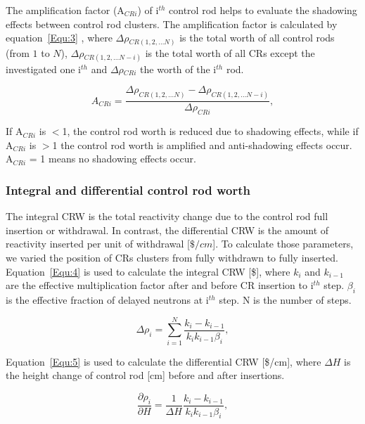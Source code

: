 The amplification factor (A$_{CRi}$) of i$^{th}$ control rod helps to evaluate the shadowing effects between control rod clusters. The amplification factor is calculated by equation~\ref{Equ:3} \cite{girardin2007control,vcerba2017optimization}, where $\Delta\rho$$_{CR(1,2,\ldots N)}$ is the total worth of all control rods (from $1$ to $N$), $\Delta\rho$$_{CR(1,2,\ldots N-i)}$ is the total worth of all CRs except the investigated one i$^{th}$ and $\Delta\rho$$_{CRi}$ the worth of the i$^{th}$ rod.

\begin{equation}
\label{Equ:3}
{{A}_{CRi}}=\dfrac{{{\Delta}{\rho}_{CR(1,2,\ldots N)}}-{{\Delta}{\rho}_{CR(1,2,\ldots N-i)}}}{{\Delta}{\rho}_{CRi}},
\end{equation}

If A$_{CRi}$ is $<$1, the control rod worth is reduced due to shadowing effects, while if A$_{CRi}$ is $>$1 the control rod worth is amplified and anti-shadowing effects occur. A$_{CRi}$ = 1 means no shadowing effects occur.

\subsubsection{Integral and differential control rod worth}

The integral CRW is the total reactivity change due to the control rod full 
insertion or withdrawal. In contrast, the differential CRW is the amount of 
reactivity inserted per unit of withdrawal [$\$/cm$]. To calculate those 
parameters, we varied the position of CRs clusters from fully withdrawn to 
fully inserted. Equation~\ref{Equ:4} is used to calculate the integral CRW 
[\$], where $k_{i}$ and $k_{i-1}$ are the effective multiplication factor 
after and before CR insertion to i$^{th}$ step. $\beta_{i}$ is the effective 
fraction of delayed neutrons at i$^{th}$ step. N is the number of steps.

\begin{equation}
\label{Equ:4}
{{\Delta}{\rho}_{i}}=\sum_{i=1}^{N}\dfrac{{k_{i}}-{k_{i-1}}}{{{k_{i}}{k_{i-1}}}{{\beta}_{i}}},
\end{equation}

Equation~\ref{Equ:5} is used to calculate the differential CRW [\$/cm], where 
$\Delta H$ is the height change of control rod [cm] before and after 
insertions.

\begin{equation}
\label{Equ:5}
\dfrac{{\partial}{\rho}_{i}}{{\partial{H}}}=\dfrac{1}{{\Delta}{H}}\dfrac{{k_{i}}-{k_{i-1}}}{{{k_{i}}{k_{i-1}}}{{\beta}_{i}}},
\end{equation}


